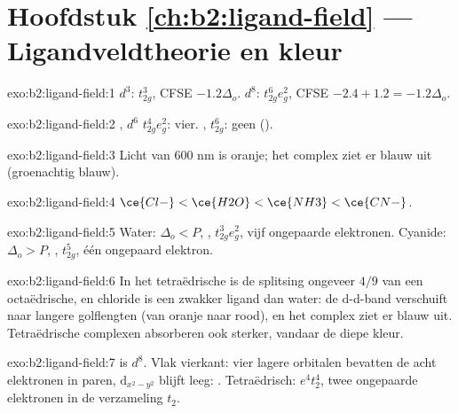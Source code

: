 \section*{Hoofdstuk \ref{ch:b2:ligand-field} --- Ligandveldtheorie en kleur}

\begin{solution}{exo:b2:ligand-field:1}
$d^3$: $t_{2g}^3$, CFSE $-1.2\Delta_o$. $d^8$: $t_{2g}^6e_g^2$, CFSE $-2.4 + 1.2 = -1.2\Delta_o$.
\end{solution}

\begin{solution}{exo:b2:ligand-field:2}
, $d^6$  $t_{2g}^4e_g^2$: vier. , 
$t_{2g}^6$: geen ().
\end{solution}

\begin{solution}{exo:b2:ligand-field:3}
Licht van 600 nm is oranje; het complex ziet er blauw uit (groenachtig blauw).
\end{solution}

\begin{solution}{exo:b2:ligand-field:4}
$\ce{Cl-} < \ce{H2O} < \ce{NH3} < \ce{CN-}$.
\end{solution}

\begin{solution}{exo:b2:ligand-field:5}
Water: $\Delta_o < P$, , $t_{2g}^3e_g^2$, vijf ongepaarde elektronen. Cyanide: $\Delta_o > P$,
, $t_{2g}^5$, één ongepaard elektron.
\end{solution}

\begin{solution}{exo:b2:ligand-field:6}
In het tetraëdrische  is de splitsing ongeveer $4/9$ van een octaëdrische, en
chloride is een zwakker ligand dan water: de d-d-band verschuift naar langere golflengten (van oranje
naar rood), en het complex ziet er blauw uit. Tetraëdrische complexen absorberen ook sterker,
vandaar de diepe kleur.
\end{solution}

\begin{solution}{exo:b2:ligand-field:7}
 is $d^8$. Vlak vierkant: vier lagere orbitalen bevatten de acht elektronen in paren,
$\mathrm d_{x^2-y^2}$ blijft leeg: . Tetraëdrisch: $e^4t_2^4$, twee ongepaarde elektronen
in de verzameling $t_2$.
\end{solution}


